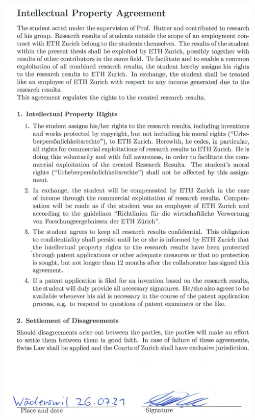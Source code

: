 \documentclass[10pt,twoside,a4paper]{report}
\begin{document}
\begin{center}
    \includegraphics[scale=0.65]{images/declaration/prop.png}
\end{center}

\setcounter{tocdepth}{2}

\cleardoublepage
\tableofcontents


\clearpage

\clearpage
% 
\end{document}

